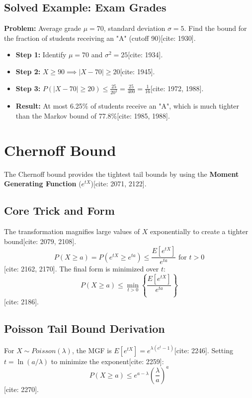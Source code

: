 \documentclass[11pt]{article}
\begin{document}
\subsection{Solved Example: Exam Grades}
\textbf{Problem:} Average grade $\mu = 70$, standard deviation $\sigma = 5$. Find the bound for the fraction of students receiving an "A" (cutoff 90)[cite: 1930].
\begin{itemize}
    \item \textbf{Step 1:} Identify $\mu = 70$ and $\sigma^2 = 25$[cite: 1934].
    \item \textbf{Step 2:} $X \ge 90 \implies |X - 70| \ge 20$[cite: 1945].
    \item \textbf{Step 3:} $P(|X - 70| \ge 20) \le \frac{25}{20^2} = \frac{25}{400} = \frac{1}{16}$[cite: 1972, 1988].
    \item \textbf{Result:} At most 6.25\% of students receive an "A", which is much tighter than the Markov bound of 77.8\%[cite: 1985, 1988].
\end{itemize}

\section{Chernoff Bound}
The Chernoff bound provides the tightest tail bounds by using the \textbf{Moment Generating Function} ($e^{tX}$)[cite: 2071, 2122].

\subsection{Core Trick and Form}
The transformation magnifies large values of $X$ exponentially to create a tighter bound[cite: 2079, 2108].
\begin{equation}
P(X \ge a) = P(e^{tX} \ge e^{ta}) \le \frac{E[e^{tX}]}{e^{ta}} \text{ for } t > 0
\end{equation}
[cite: 2162, 2170]. The final form is minimized over $t$:
\begin{equation}
P(X \ge a) \le \min_{t>0} \left\{ \frac{E[e^{tX}]}{e^{ta}} \right\}
\end{equation}
[cite: 2186].

\subsection{Poisson Tail Bound Derivation}
For $X \sim Poisson(\lambda)$, the MGF is $E[e^{tX}] = e^{\lambda(e^t - 1)}$[cite: 2246].
Setting $t = \ln(a/\lambda)$ to minimize the exponent[cite: 2259]:
\begin{equation}
P(X \ge a) \le e^{a - \lambda} \left( \frac{\lambda}{a} \right)^a
\end{equation}
[cite: 2270].
\end{document}
